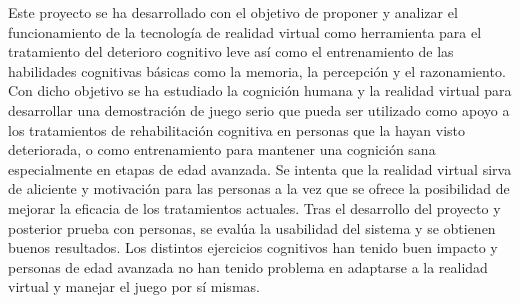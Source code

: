 Este proyecto se ha desarrollado con el objetivo de proponer y analizar el funcionamiento de la tecnología de realidad virtual como herramienta para el tratamiento del deterioro cognitivo leve así como el entrenamiento de las habilidades cognitivas básicas como la memoria, la percepción y el razonamiento. Con dicho objetivo se ha estudiado la cognición humana y la realidad virtual para desarrollar una demostración de juego serio que pueda ser utilizado como apoyo a los tratamientos de rehabilitación cognitiva en personas que la hayan visto deteriorada, o como entrenamiento para mantener una cognición sana especialmente en etapas de edad avanzada. Se intenta que la realidad virtual sirva de aliciente y motivación para las personas a la vez que se ofrece la posibilidad de mejorar la eficacia de los tratamientos actuales. Tras el desarrollo del proyecto y posterior prueba con personas, se evalúa la usabilidad del sistema y se obtienen buenos resultados. Los distintos ejercicios cognitivos han tenido buen impacto y personas de edad avanzada no han tenido problema en adaptarse a la realidad virtual y manejar el juego por sí mismas. 




\blankpage
